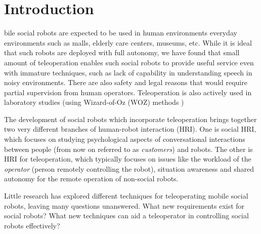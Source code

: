 \documentclass[journal]{IEEEtran}
\begin{document}
\section{Introduction}

bile social robots are expected to be used in human environments everyday environments such as malls, elderly care centers, museums, etc.
While it is ideal that such robots are deployed with full autonomy, we have found that small amount of teleoperation enables such social robots to provide useful service \cite{glas:simultaneous, zheng:howMany} even with immature techniques, such as lack of capability in understanding speech in noisy environments. 
There are also safety and legal reasons that would require partial supervision from human operators.
Teleoperation is also actively used in laboratory studies (using Wizard-of-Oz (WOZ) methods \cite{green:applying, steinfeld:theOz, dahlback:wizard})



The development of social robots which incorporate teleoperation brings together two very different branches of human-robot interaction (HRI).
One is social HRI, which focuses on studying psychological aspects of conversational interactions between people (from now on referred to as {\it customers}) and robots.
The other is HRI for teleoperation, which typically focuses on issues like the workload of the {\it operator} (person remotely controlling the robot), situation awareness and shared autonomy \cite{pitzer:sharedAutonomy} for the remote operation of non-social robots.

Little research has explored different techniques for teleoperating mobile social robots, leaving many questions unanswered.
What new requirements exist for social robots? What new techniques can aid a teleoperator in controlling social robots effectively?
\end{document}
